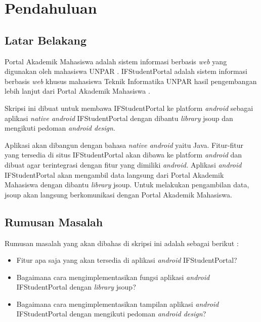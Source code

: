 \chapter{Pendahuluan}
\label{chap:intro}
   
\section{Latar Belakang}
\label{sec:label}

Portal Akademik Mahasiswa adalah sistem informasi berbasis \textit{web} yang digunakan oleh mahasiswa UNPAR \cite{studentportalunpar}. IFStudentPortal adalah sistem informasi berbasis \textit{web} khusus mahasiswa Teknik Informatika UNPAR hasil pengembangan  lebih lanjut dari Portal Akademik Mahasiswa \cite{herfan:15:portal}. 

Skripsi ini dibuat untuk membawa IFStudentPortal ke platform \textit{android} sebagai aplikasi \textit{native android} IFStudentPortal dengan dibantu \textit{library} jsoup dan mengikuti pedoman \textit{android design}. 

 Aplikasi akan dibangun dengan bahasa \textit{native android} yaitu Java. Fitur-fitur yang tersedia di situs IFStudentPortal akan dibawa ke platform \textit{android} dan dibuat agar terintegrasi dengan fitur yang dimiliki \textit{android.} Aplikasi \textit{android} IFStudentPortal akan mengambil data langsung dari Portal Akademik Mahasiswa dengan dibantu \textit{library} jsoup. Untuk melakukan pengambilan data, jsoup akan langsung berkomunikasi dengan Portal Akademik Mahasiswa.  

\section{Rumusan Masalah}
\label{sec:rumusan}
Rumusan masalah yang akan dibahas di skripsi ini adalah sebagai berikut :
\begin{itemize}
    \item Fitur apa saja yang akan tersedia di aplikasi \textit{android} IFStudentPortal?
    \item Bagaimana cara mengimplementasikan fungsi aplikasi \textit{android} IFStudentPortal dengan \textit{library} jsoup?
    \item Bagaimana cara mengimplementasikan tampilan aplikasi \textit{android} IFStudentPortal dengan mengikuti pedoman \textit{android design}?
\end{itemize}

